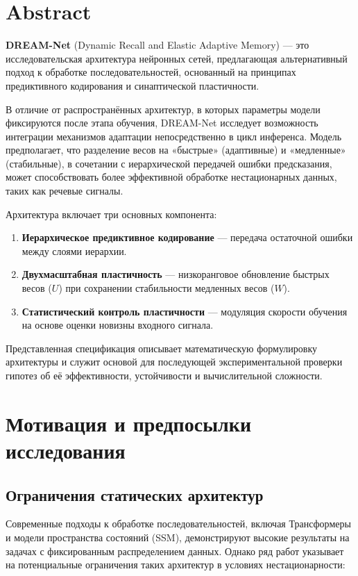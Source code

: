 \section{Abstract}

\textbf{DREAM-Net} (Dynamic Recall and Elastic Adaptive Memory) — это исследовательская архитектура нейронных сетей, предлагающая альтернативный подход к обработке последовательностей, основанный на принципах предиктивного кодирования и синаптической пластичности.

В отличие от распространённых архитектур, в которых параметры модели фиксируются после этапа обучения, DREAM-Net исследует возможность интеграции механизмов адаптации непосредственно в цикл инференса. Модель предполагает, что разделение весов на «быстрые» (адаптивные) и «медленные» (стабильные), в сочетании с иерархической передачей ошибки предсказания, может способствовать более эффективной обработке нестационарных данных, таких как речевые сигналы.

Архитектура включает три основных компонента:
\begin{enumerate}
    \item \textbf{Иерархическое предиктивное кодирование} — передача остаточной ошибки между слоями иерархии.
    \item \textbf{Двухмасштабная пластичность} — низкоранговое обновление быстрых весов ($U$) при сохранении стабильности медленных весов ($W$).
    \item \textbf{Статистический контроль пластичности} — модуляция скорости обучения на основе оценки новизны входного сигнала.
\end{enumerate}

Представленная спецификация описывает математическую формулировку архитектуры и служит основой для последующей экспериментальной проверки гипотез об её эффективности, устойчивости и вычислительной сложности.

\section{Мотивация и предпосылки исследования}

\subsection{Ограничения статических архитектур}

Современные подходы к обработке последовательностей, включая Трансформеры и модели пространства состояний (SSM), демонстрируют высокие результаты на задачах с фиксированным распределением данных. Однако ряд работ указывает на потенциальные ограничения таких архитектур в условиях нестационарности:

